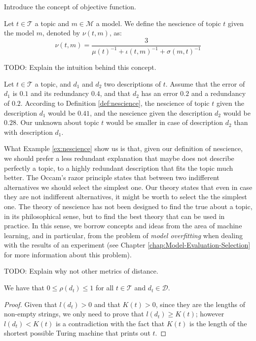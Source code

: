{\color{red} Introduce the concept of objective function.}

\begin{definition} [Nescience]
\label{def:nescience}
Let $t \in \mathcal{T}$ a topic and $m \in \mathcal{M}$ a model. We define the nescience of topic $t$ given the model $m$, denoted by $\nu\left(t, m \right)$, as:
\[
\nu\left(t, m \right) = \frac{3}{ \mu(t)^{-1} + \iota(t, m)^{-1} + \sigma(m, t)^{-1}} 
\]
\end{definition}

{\color{red} TODO: Explain the intuition behind this concept.}

\begin{example}
\label{ex:nescience}
Let $t \in \mathcal{T}$ a topic, and $d_1$ and $d_2$ two descriptions of $t$. Assume that the error of $d_1$ is $0.1$ and its redundancy $0.4$, and that $d_2$ has an error $0.2$ and a redundancy of $0.2$. According to Definition \ref{def:nescience}, the nescience of topic $t$ given the description $d_1$ would be $0.41$, and the nescience given the description $d_2$ would be $0.28$. Our unknown about topic $t$ would be smaller in case of description $d_2$ than with description $d_1$.
\end{example}

What Example \ref{ex:nescience} show us is that, given our definition of nescience, we should prefer a less redundant explanation that maybe does not describe perfectly a topic, to a highly redundant description that fits the topic much better. The Occam's razor principle states that between two indifferent alternatives we should select the simplest one. Our theory states that even in case they are not indifferent alternatives, it might be worth to select the the simplest one. The theory of nescience has not been designed to find the true about a topic, in its philosophical sense, but to find the best theory that can be used in practice. In this sense, we borrow concepts and ideas from the area of machine learning, and in particular, from the problem of \emph{model overfitting} when dealing with the results of an experiment (see Chapter \ref{chap:Model-Evaluation-Selection} for more information about this problem).

{\color{red} TODO: Explain why not other metrics of distance.}

\begin{proposition}
\label{prop:range_redundancy}
We have that $0 \leq \rho(d_t) \leq 1$ for all $t \in \mathcal{T}$ and $d_t \in \mathcal{D}$.
\end{proposition}
\begin{proof}
Given that $l\left(d_t\right)>0$ and that $K\left(t\right)>0$, since they are the lengths of non-empty strings, we only need to prove that $l\left(d_t\right) \geq K\left(t\right)$; however $l\left(d_t\right) < K\left(t\right)$ is a contradiction with the fact that $K\left(t\right)$ is the length of the shortest possible Turing machine that prints out $t$.
\end{proof}


